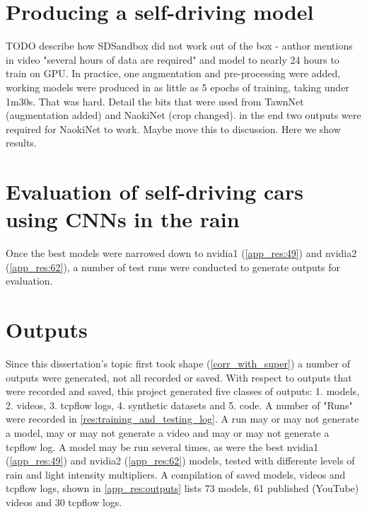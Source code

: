 
\section{Producing a self-driving model}
TODO describe how SDSandbox did not work out of the box - author mentions in video "several hours of data are required" and model to nearly 24 hours to train on GPU. In practice, one augmentation and pre-processing were added, working models were produced in as little as 5 epochs of training, taking under 1m30s.
That was hard. Detail the bits that were used from TawnNet (augmentation added) and NaokiNet (crop changed). in the end two outputs were required for NaokiNet to work. Maybe move this to discussion. Here we show results.


\section{Evaluation of self-driving cars using CNNs in the rain}

Once the best models were narrowed down to nvidia1 (\ref{app_res:49}) and nvidia2 (\ref{app_res:62}), a number of test runs were conducted to generate outputs for evaluation. 


\section{Outputs}
Since this dissertation's topic first took shape (\ref{corr_with_super}) a number of outputs were generated, not all recorded or saved. With respect to outputs that were recorded and saved, this project generated five classes of outputs: 1. models, 2. videos, 3. tcpflow logs, 4. synthetic datasets and 5. code. A number of "Runs" were recorded in \ref{res:training_and_testing_log}. A run may or may not generate a model, may or may not generate a video and may or may not generate a tcpflow log. A model may be run several times, as were the best nvidia1 (\ref{app_res:49}) and nvidia2 (\ref{app_res:62}) models, tested with differente levels of rain and light intensity multipliers.
A compilation of saved models, videos and tcpflow logs, shown in \ref{app_res:outputs} lists 73 models, 61 published (YouTube) videos and 30 tcpflow logs. 

